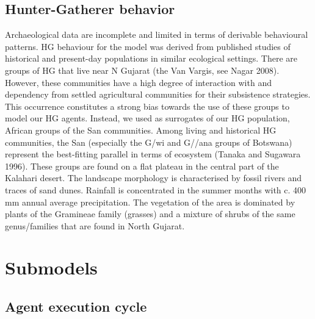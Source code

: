 \documentclass[11pt,oneside,a4paper,openright]{report}
\begin{document}
\subsection{Hunter-Gatherer behavior}
Archaeological data are incomplete and limited in terms of derivable behavioural patterns. HG
behaviour for the model was derived from published studies of historical and present-day populations
in similar ecological settings. There are groups of HG that live near N Gujarat (the Van Vargis, see
Nagar 2008). However, these communities have a high degree of interaction with and dependency
from settled agricultural communities for their subsistence strategies. This occurrence constitutes a
strong bias towards the use of these groups to model our HG agents. Instead, we used as surrogates
of our HG population, African groups of the San communities.
Among living and historical HG communities, the San (especially the G/wi and G//ana groups of
Botswana) represent the best-fitting parallel in terms of ecosystem (Tanaka and Sugawara 1996).
These groups are found on a flat plateau in the central part of the Kalahari desert. The landscape
morphology is characterised by fossil rivers and traces of sand dunes. Rainfall is concentrated in the
summer months with c. 400 mm annual average precipitation. The vegetation of the area is dominated
by plants of the Gramineae family (grasses) and a mixture of shrubs of the same genus/families that
are found in North Gujarat.


\section{Submodels}

\subsection{Agent execution cycle}



	
\end{document}
